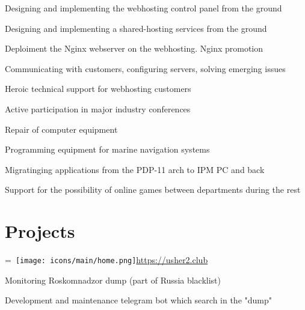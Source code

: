 \documentclass[]{schorscv}
\begin{document}
\begin{minipage}[t]{0.70\textwidth}
\begin{tightemize}
\sectionsep
\item Designing and implementing the webhosting control panel from the ground
\item Designing and implementing a shared-hosting services from the ground
\item Deploiment the Nginx webserver on the webhosting. Nginx promotion
\item Communicating with customers, configuring servers, solving emerging issues
\item Heroic technical support for webhosting customers
\item Active participation in major industry conferences
\end{tightemize}
\sectionsep

\begin{tightemize}
\sectionsep
\item Repair of computer equipment
\item Programming equipment for marine navigation systems
\item Migratinging applications from the PDP-11 arch to IPM PC and back
\item Support for the possibility of online games between departments during the rest
\end{tightemize}
\sectionsep



\section{Projects}

\begingroup
{}=\hbox{
\texttt{[image: icons/main/home.png]}\hspace{0.3cm}\href{https://usher2.club}{https://usher2.club}
}
\parbox{\wd0}{}\endgroup
\sectionsep

\begin{tightemize}
\item Monitoring Roskomnadzor dump (part of Russia blacklist)
\item Development and maintenance telegram bot which search in the "dump"
\end{tightemize}
\sectionsep


\end{minipage}
\end{document}
